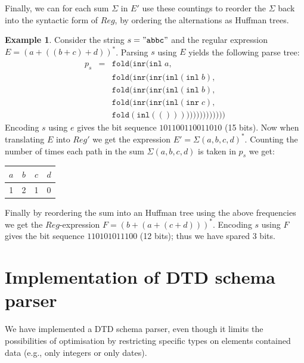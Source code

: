\documentclass[a4paper, oneside]{memoir}
\theoremstyle{definition}
\newtheorem{example}{Example}
\begin{document}
Finally, we can for each sum $\Sigma$ in $E'$ use these countings to reorder the
$\Sigma$ back into the syntactic form of $Reg$, by ordering the alternations as
Huffman trees.

\begin{example}
  Consider the string $s = \mathtt{"abbc"}$ and the regular expression $E = (a +
  ((b + c) + d))^{*}$. Parsing $s$ using $E$ yields the following parse tree:
\[
\begin{array}{rcl}
p_s & = & \mathtt{fold}(\mathtt{inr}(\mathtt{inl} \; a, \\
    &   & \mathtt{fold}(\mathtt{inr}(\mathtt{inr}(\mathtt{inl}(\mathtt{inl} \; b), \\
    &   & \mathtt{fold}(\mathtt{inr}(\mathtt{inr}(\mathtt{inl}(\mathtt{inl} \; b), \\
    &   & \mathtt{fold}(\mathtt{inr}(\mathtt{inr}(\mathtt{inl}(\mathtt{inr} \; c), \\
    &   & \mathtt{fold}(\mathtt{inl}(()))))))))))))))
\end{array}
\]
\noindent Encoding $s$ using $e$ gives the bit sequence $101100110011010$ (15
bits). Now when translating $E$ into $Reg'$ we get the expression $E' =
\Sigma{(a, b, c, d)}^{*}$. Counting the number of times each path in the sum
$\Sigma{(a, b, c, d)}$ is taken in $p_s$ we get:

\begin{center}
\begin{tabular}{c|c|c|c}
$a$ & $b$ & $c$ & $d$ \\
\hline
1   & 2   & 1   & 0
\end{tabular}
\end{center}

\noindent Finally by reordering the sum into an Huffman tree using the above
frequencies we get the $Reg$-expression $F = (b + (a + (c + d)))^{*}$. Encoding
$s$ using $F$ gives the bit sequence $110101011100$ (12 bits); thus we have
spared 3 bits.

\end{example}

\chapter{Implementation of DTD schema parser}

We have implemented a DTD schema parser, even though it limits the possibilities
of optimisation by restricting specific types on elements contained data (e.g.,
only integers or only dates).
\end{document}
